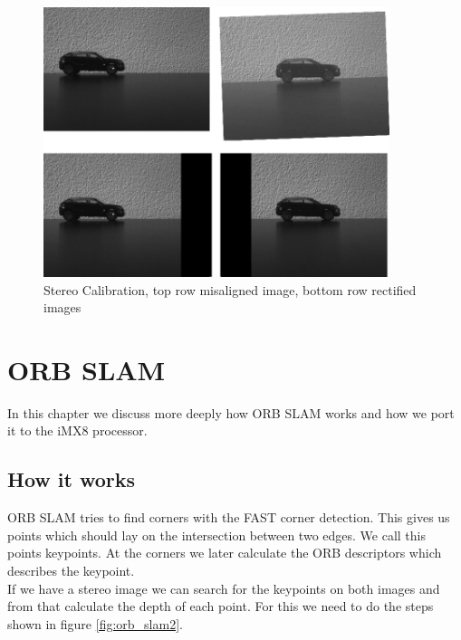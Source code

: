 \documentclass[11pt,a4paper,titlepage,oneside]{report}
\begin{document}

\begin{figure}[H]
  \begin{center}
		\includegraphics[width=0.9\textwidth]{img/stereo_calib.png}
  \end{center}
	\caption{Stereo Calibration, top row misaligned image, bottom row rectified images}\label{fig:stereo_calib}
\end{figure}

\chapter{ORB SLAM}\label{chap:implementation}

In this chapter we discuss more deeply how ORB SLAM works and how we port it to the iMX8 processor.

\section{How it works}
ORB SLAM tries to find corners with the FAST corner detection. This gives us points which should lay on the intersection between two edges. We call this points keypoints. At the corners we later calculate the ORB descriptors which describes the keypoint.\\
If we have a stereo image we can search for the keypoints on both images and from that calculate the depth of each point. For this we need to do the steps shown in figure \ref{fig:orb_slam2}.
\end{document}

